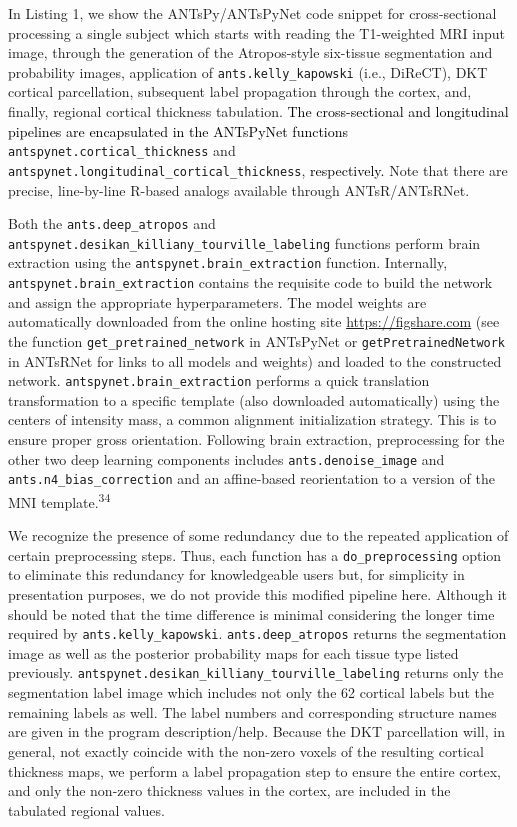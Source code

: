 \documentclass[
  12pt,
]{article}
\begin{document}

In Listing 1, we show the ANTsPy/ANTsPyNet code snippet for
cross-sectional processing a single subject which starts with reading
the T1-weighted MRI input image, through the generation of the
Atropos-style six-tissue segmentation and probability images,
application of \texttt{ants.kelly\_kapowski} (i.e., DiReCT), DKT
cortical parcellation, subsequent label propagation through the cortex,
and, finally, regional cortical thickness tabulation.
\textcolor{black}{The
cross-sectional and longitudinal pipelines are encapsulated in the ANTsPyNet
functions} \texttt{antspynet.cortical\_thickness} and
\texttt{antspynet.longitudinal\_cortical\_thickness},
\textcolor{black}{respectively.} Note that there are precise,
line-by-line R-based analogs available through ANTsR/ANTsRNet.

Both the \texttt{ants.deep\_atropos} and
\texttt{antspynet.desikan\_killiany\_tourville\_labeling} functions
perform brain extraction using the \texttt{antspynet.brain\_extraction}
function. Internally, \texttt{antspynet.brain\_extraction} contains the
requisite code to build the network and assign the appropriate
hyperparameters. The model weights are automatically downloaded from the
online hosting site \url{https://figshare.com} (see the function
\texttt{get\_pretrained\_network} in ANTsPyNet or
\texttt{getPretrainedNetwork} in ANTsRNet for links to all models and
weights) and loaded to the constructed network.
\texttt{antspynet.brain\_extraction} performs a quick translation
transformation to a specific template (also downloaded automatically)
using the centers of intensity mass, a common alignment initialization
strategy. This is to ensure proper gross orientation. Following brain
extraction, preprocessing for the other two deep learning components
includes \texttt{ants.denoise\_image} and
\texttt{ants.n4\_bias\_correction} and an affine-based reorientation to
a version of the MNI template.\textsuperscript{34}

We recognize the presence of some redundancy due to the repeated
application of certain preprocessing steps. Thus, each function has a
\texttt{do\_preprocessing} option to eliminate this redundancy for
knowledgeable users but, for simplicity in presentation purposes, we do
not provide this modified pipeline here. Although it should be noted
that the time difference is minimal considering the longer time required
by \texttt{ants.kelly\_kapowski}. \texttt{ants.deep\_atropos} returns
the segmentation image as well as the posterior probability maps for
each tissue type listed previously.
\texttt{antspynet.desikan\_killiany\_tourville\_labeling} returns only
the segmentation label image which includes not only the 62 cortical
labels but the remaining labels as well. The label numbers and
corresponding structure names are given in the program description/help.
Because the DKT parcellation will, in general, not exactly coincide with
the non-zero voxels of the resulting cortical thickness maps, we perform
a label propagation step to ensure the entire cortex, and only the
non-zero thickness values in the cortex, are included in the tabulated
regional values.
\end{document}
